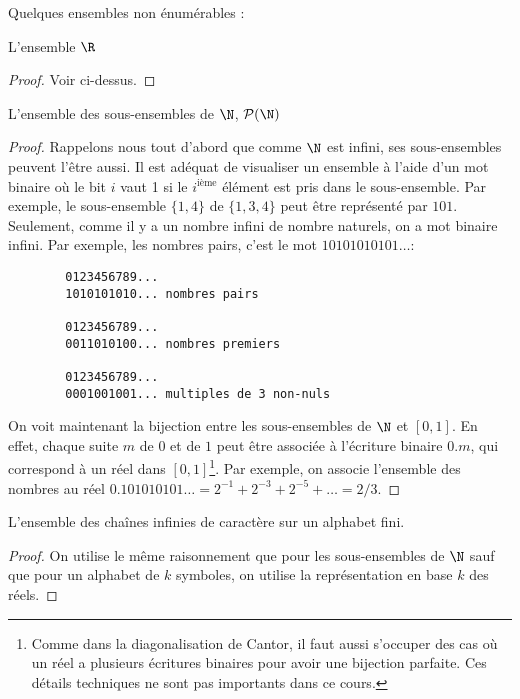 Quelques ensembles non énumérables :
\begin{myexem}
 L'ensemble $\R$
 \begin{proof}
   Voir ci-dessus.
 \end{proof}
\end{myexem}

\begin{myexem}
 L'ensemble des sous-ensembles de $\N$, $\mathcal{P}(\N)$
 \begin{proof}
   Rappelons nous tout d'abord que comme $\N$ est infini, ses sous-ensembles peuvent l'être aussi.
   Il est adéquat de visualiser un ensemble à l'aide d'un mot binaire
   où le bit $i$ vaut 1 si le $i^{\mathrm{ième}}$ élément est pris dans le sous-ensemble.
   Par exemple, le sous-ensemble $\{1,4\}$ de $\{1,3,4\}$ peut être représenté par $101$.
   Seulement, comme il y a un nombre infini de nombre naturels, on a mot binaire infini.
   Par exemple, les nombres pairs, c'est le mot $10101010101\ldots$:
   \begin{verbatim}
		0123456789...
		1010101010... nombres pairs
		
		0123456789...
		0011010100... nombres premiers
		
		0123456789...
		0001001001... multiples de 3 non-nuls
    \end{verbatim}
   On voit maintenant la bijection entre les sous-ensembles de $\N$ et $[0,1]$.
   En effet, chaque suite $m$ de $0$ et de $1$ peut être associée à l'écriture binaire $0.m$, qui correspond à un réel dans $[0,1]$\footnote{Comme dans la diagonalisation de Cantor, il faut aussi s'occuper des cas où un réel a plusieurs écritures binaires pour avoir une bijection parfaite. Ces détails techniques ne sont pas importants dans ce cours.}. Par exemple, on associe l'ensemble des nombres au réel $0.101010101\ldots = 2^{-1}+2^{-3}+2^{-5}+\ldots = 2/3$.
 \end{proof}
\end{myexem}

\begin{myexem}
 L'ensemble des chaînes infinies de caractère sur un alphabet fini.
 \begin{proof}
   On utilise le même raisonnement que pour les sous-ensembles de $\N$ sauf que pour un alphabet de $k$ symboles,
   on utilise la représentation en base $k$ des réels.
 \end{proof}
\end{myexem}

